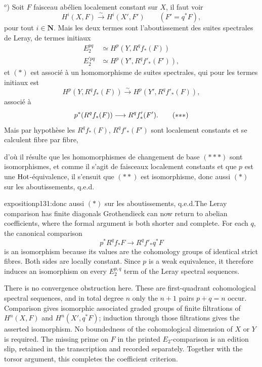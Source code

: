 $^o$) Soit $F$ faisceau abélien localement constant sur $X$, il faut voir
\[
H^i(X,F) \xrightarrow{\ \sim\ } H^i(X', F') \qquad (F' = q^*F), \tag*{$(*)$}
\]
pour tout $i \in \mathbf{N}$. Mais les deux termes sont l'aboutissement des suites spectrales de Leray, de termes initiaux
\[
\begin{aligned}
E_2^{pq} &\simeq H^p(Y, R^q f_*(F)) \\
E^{\prime pq}_2 &\simeq H^p(Y', R^q f'_*(F')),
\end{aligned}
\]
et $(*)$ est associé à un homomorphisme de suites spectrales, qui pour les termes initiaux est
\[
H^p(Y, R^q f_*(F)) \xrightarrow{\sim} H^p(Y', R^q f'_*(F)), \tag*{$(**)$} %
\]
associé à
\[
p^*(R^q f_*(F)) \longrightarrow R^q f'_*(F'). \tag*{$(*{*}*)$}
\]
Mais par hypothèse les $R^q f_*(F)$, $R^q f'_*(F')$ sont localement constants et se calculent fibre par fibre,


\noindent d'où il résulte que les homomorphismes de changement de base $(*{*}*)$ sont isomorphismes, et comme il s'agit de faisceaux localement constants et que $p$ est une $\mathrm{Hot}$-équivalence, il s'ensuit que $(**)$ est isomorphisme, donc aussi $(*)$ sur les aboutissements, q.e.d.

\begin{dcomment}{exposition}{p131:donc aussi $(*)$ sur les aboutissements, q.e.d.}{The Leray comparison has finite diagonals}
Grothendieck can now return to abelian coefficients, where the formal argument is both shorter and complete. For each \(q\), the canonical comparison
\[
 p^*R^qf_*F\longrightarrow R^qf'_*q^*F
\]
is an isomorphism because its values are the cohomology groups of identical strict fibres. Both sides are locally constant. Since \(p\) is a weak equivalence, it therefore induces an isomorphism on every \(E_2^{p,q}\) term of the Leray spectral sequences.

There is no convergence obstruction here. These are first-quadrant cohomological spectral sequences, and in total degree \(n\) only the \(n+1\) pairs \(p+q=n\) occur. Comparison gives isomorphic associated graded groups of finite filtrations of \(H^n(X,F)\) and \(H^n(X',q^*F)\); induction through those filtrations gives the asserted isomorphism. No boundedness of the cohomological dimension of \(X\) or \(Y\) is required. The missing prime on \(F\) in the printed \(E_2\)-comparison is an edition slip, retained in the transcription and recorded separately. Together with the torsor argument, this completes the coefficient criterion.
\end{dcomment}


